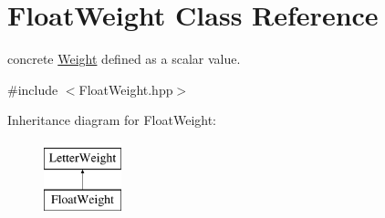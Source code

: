 \hypertarget{classFloatWeight}{}\section{Float\+Weight Class Reference}
\label{classFloatWeight}


concrete \mbox{\hyperlink{classWeight}{Weight}} defined as a scalar value.  




{\ttfamily \#include $<$Float\+Weight.\+hpp$>$}

Inheritance diagram for Float\+Weight\+:\begin{figure}[H]
\begin{center}
\leavevmode
\includegraphics[height=2.000000cm]{classFloatWeight}
\end{center}
\end{figure}
